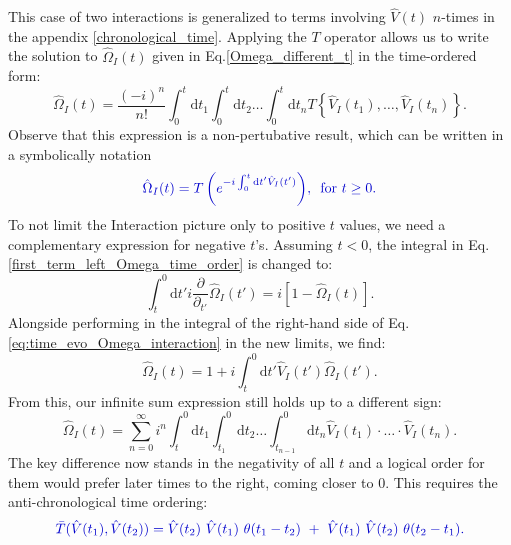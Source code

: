 \documentclass[12pt, titlepage]{article}
\begin{document}
This case of two interactions is generalized to terms involving $\hat{V}(t) $ $ n $-times in the appendix \ref{chronological_time}.  
Applying the $ T $ operator allows us to write the solution to $ \hat{\Omega}_{I}(t) $ given in Eq.\enskip\eqref{Omega_different_t} in the time-ordered form:
\begin{equation}\label{Omega_I_long_timeorderd}
\hat{\Omega}_{I}(t)
=
\frac{(-i)^{n}}{n!}
\int_{0}^{t}\mathrm{d}t_1\int_{0}^{t}\! \! \mathrm{d}t_2
 \ldots
 \int_{0}^{t}\! \! \mathrm{d}t_n
 T\left\lbrace \hat{V}_{I}(t_1), \ldots , \hat{V}_{I}(t_n)\right\rbrace 
 .
\end{equation}
Observe that this expression is a non-pertubative result, which can  be written in a symbolically notation
\begin{equation}\label{eq:Omega_I_Chron_0}
\textcolor[RGB]{0,0,204}{
\hat{\Omega}_{I}(t)
=T\left( e^{-i\int_{0}^{t}\mathrm{d}t^{\prime} \hat{V}_{I}(t^{\prime})} \right)
	\! ,\text{\enskip for  }  t\geq 0 
	.}
\end{equation}
To not limit the Interaction picture only to positive $ t $ values, we need a complementary expression for negative $ t $'s. Assuming $ t<0 $, the integral in Eq.\enskip\eqref{first_term_left_Omega_time_order} is changed to:
 \begin{equation}\label{first_term_left_anti_chrono}
 \int_{t}^{0}\mathrm{d}t'
 i
 \frac{\partial}{\partial_{t'}} 
 \hat{\Omega}_{I} (t')
 =
 i
 \left[ 
1 -\hat{\Omega}_{I}(t)
 \right] .
 \end{equation}
 Alongside performing in the integral of the right-hand side of  Eq.\enskip\eqref{eq:time_evo_Omega_interaction} in the new limits, we find:
 \begin{equation}
  \hat{\Omega}_{I}(t)=
1
+
i
\int^{0}_{t}\mathrm{d}t'\hat{V}_{I}(t')\hat{\Omega}_{I}(t')	.
  \end{equation} 
From this, our infinite sum expression still holds up to a different sign:
\begin{equation}\label{Omega_anti_without_anti}
\hat{\Omega}_{I}(t) =
\sum\limits_{n=0}^{\infty} 
i^{n}
\int^{0}_{t}\mathrm{d}t_1\int^{0}_{t_{1}}\! \! \mathrm{d}t_2
 \ldots
 \int^{0}_{t_{n-1}}\! \! \mathrm{d}t_n
  \hat{V}_{I}(t_1)\cdot \ldots \cdot \hat{V}_{I}(t_n).
\end{equation}
The key difference now stands in the negativity of all $ t $ and a logical order for them would prefer later times to the right, coming closer to $ 0 $. This requires the anti-chronological time ordering:
 \begin{equation}\label{eq:anti-chron-time_ordering}
\textcolor[RGB]{0,0,204}{
\bar{T}(\hat{V}(t_1), \hat{V}(t_2))=\hat{V}(t_2)\ \hat{V}(t_1)\ \theta (t_1 -t_2)\ +\ \hat{V}(t_1)\  \hat{V}(t_2) \ \theta (t_2-t_1)
.}
\end{equation}
\end{document}
